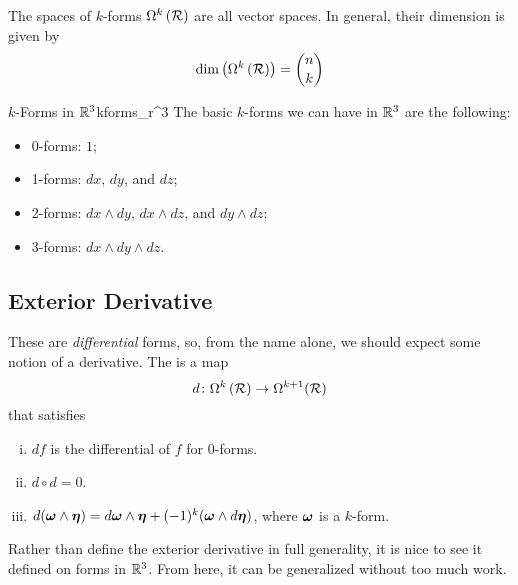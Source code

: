 \begin{remark}
The spaces of $k$-forms $\Omega^k\left(\mathcal{R}\right)$ are all vector spaces.  In general, their dimension is given by
\[
\dim \left( \Omega^k\left(\mathcal{R}\right)\right) = \binom{n}{k}
\]
\end{remark}

\begin{ex}{$k$-Forms in $\mathbb{R}^3$}{kforms_r^3}
The basic $k$-forms we can have in $\mathbb{R}^3$ are the following:
\begin{itemize}
    \item 0-forms: $1$;
    \item 1-forms: $dx$, $dy$, and $dz$;
    \item 2-forms: $dx\wedge dy$, $dx\wedge dz$, and $dy\wedge dz$;
    \item 3-forms: $dx\wedge dy \wedge dz$.
\end{itemize}
\end{ex}

\subsection{Exterior Derivative}

These are \emph{differential} forms, so, from the name alone, we should expect some notion of a derivative.  The  is a map
\[
d\colon \Omega^k\left(\mathcal{R}\right) \to \Omega^{k+1}(\mathcal{R})
\]
that satisfies
\begin{enumerate}[(i)]
    \item $df$ is the differential of $f$ for 0-forms.
    \item $d\circ d=0$.
    \item $d(\boldsymbol{\omega} \wedge \boldsymbol{\eta})=d\boldsymbol{\omega} \wedge \boldsymbol{\eta} + (-1)^k(\boldsymbol{\omega} \wedge d\boldsymbol{\eta})$, where $\boldsymbol{\omega}$ is a $k$-form.
\end{enumerate}
Rather than define the exterior derivative in full generality, it is nice to see it defined on forms in $\mathbb{R}^3$.  From here, it can be generalized without too much work.  

